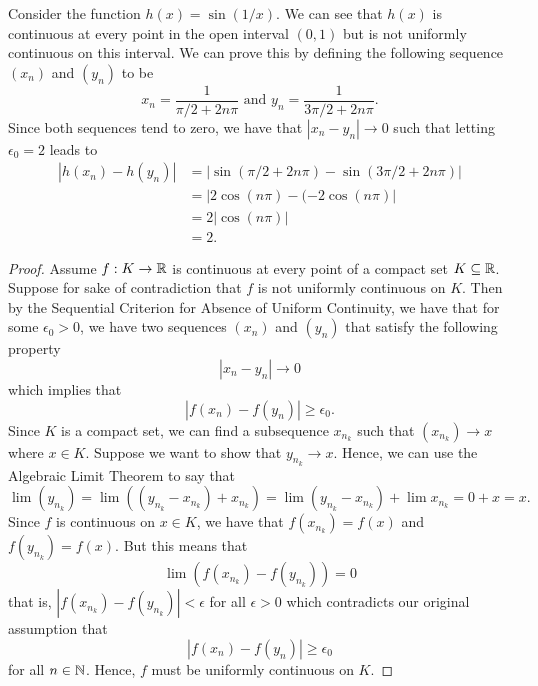     Consider the function \( h(x) = \sin (1/x) \). We can see that \( h(x) \) is continuous at every point in the open interval \( (0,1) \) but is not uniformly continuous on this interval. We can prove this by defining the following sequence \( (x_n) \) and \( (y_n) \) to be 
    \[  x_n = \frac{ 1 }{ \pi / 2 + 2n \pi } \text{~and~} y_n = \frac{ 1 }{ 3\pi / 2 + 2n \pi }. \]
Since both sequences tend to zero, we have that \( | x_n - y_n | \to 0  \) such that letting \( \epsilon_0 = 2  \) leads to 
\begin{align*}
    | h(x_n) - h(y_n) | &= | \sin(\pi / 2 + 2n \pi ) - \sin( 3 \pi / 2 + 2n \pi)|  \\
                        &= | 2\cos(n \pi) - (-2\cos(n \pi)  | \\ 
                        &= 2 | \cos(n \pi) | \\  
                        &= 2.
\end{align*}



\begin{proof}
Assume \( f: K \to \mathbb{R}  \) is continuous at every point of a compact set \( K \subseteq \mathbb{R}  \). Suppose for sake of contradiction that \( f \) is not uniformly continuous on \( K \). Then by the Sequential Criterion for Absence of Uniform Continuity, we have that for some \( \epsilon_0 > 0  \), we have two sequences \( (x_n) \) and \( (y_n) \) that satisfy the following property 
\[  | x_n - y_n | \to 0  \] which implies that 
\[  | f(x_n) - f(y_n) | \geq \epsilon_0. \]
Since \( K  \) is a compact set, we can find a subsequence \( x_{n_k} \) such that \( (x_{n_k}) \to x  \) where \( x \in K  \). Suppose we want to show that \( y_{n_k} \to x  \). Hence, we can use the Algebraic Limit Theorem to say that 
\[ \lim (y_{n_k}) = \lim ((y_{n_k} - x_{n_k}) + x_{n_k}) = \lim (y_{n_k} - x_{n_k}) + \lim x_{n_k} = 0 + x = x.  \]
Since \( f \) is continuous on \( x \in K  \), we have that \( f(x_{n_k}) = f(x) \) and \( f(y_{n_k}) = f(x) \). But this means that 
\[ \lim (f(x_{n_k}) - f(y_{n_k})) = 0   \]
that is, \( | f(x_{n_k}) - f(y_{n_k})  | < \epsilon \)
for all \( \epsilon > 0  \)
which contradicts our original assumption that 
\[  | f(x_n) - f(y_n) | \geq \epsilon_0 \]
for all \( n \in \mathbb{N}  \). Hence, \( f \) must be uniformly continuous on \( K \).
\end{proof}



